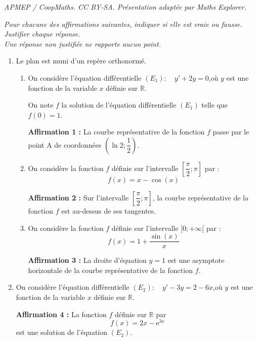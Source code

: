 \documentclass[10pt]{article}
\providecommand{\R}{\mathbb{R}}
\providecommand{\e}{{\mathrm{e}}}
\begin{document}
\noindent\textit{APMEP / CoopMaths. CC BY-SA. Présentation adaptée par Maths Explorer.}\par\medskip
\emph{Pour chacune des affirmations suivantes, indiquer si elle est vraie ou    fausse.\\
	Justifier chaque réponse.\\
	Une réponse non justifiée ne rapporte aucun point.}

	\begin{enumerate}
		\item Le plan est muni d'un repère orthonormé.
		\begin{enumerate}
			\item On considère l'équation différentielle \quad $\left(E_{1}\right): \quad y'+2 y=0$,\quad où $y$ est une fonction de la variable $x$ définie sur $\R$.

			On note $f$ la solution de l'équation différentielle $(E_{1})$ telle que $f(0)=1$.

			\textbf{Affirmation 1 :} La courbe représentative de la fonction $f$ passe par le point A de coordonnées $\left(\ln 2 ; \dfrac{1}{2}\right)$.

			\item On considère la fonction $f$ définie sur l'intervalle $\left[\dfrac{\pi}{2} ; \pi\right]$ par :
			\[f(x)=x-\cos (x)\]

			\textbf{Affirmation 2 :} Sur l'intervalle $\left[\dfrac{\pi}{2} ; \pi\right]$, la courbe représentative de la fonction $f$ est au-dessus de ses tangentes.

			\item On considère la fonction $f$ définie sur l'intervalle $] 0 ;+\infty[$ par :
			\[f(x)=1+\dfrac{\sin (x)}{x}\]

			\textbf{Affirmation 3 :} La droite d'équation $y=1$ est une asymptote horizontale de la courbe représentative de la fonction $f$.
		\end{enumerate}

		\item On considère l'équation différentielle \quad $\left(E_{2}\right): \quad y'-3 y=2-6 x$,\quad où $y$ est une fonction de la variable $x$ définie sur $\R$.

		\textbf{Affirmation 4 :} La fonction $f$ définie sur $\R$ par
		\[f(x)=2 x-\e^{3 x}\]
		est une solution de l'équation $(E_{2})$.
	\end{enumerate}
\end{document}
